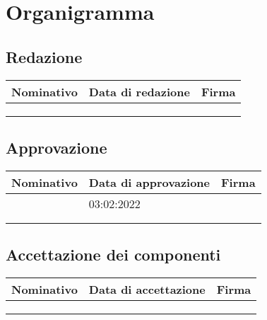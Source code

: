 \section{Organigramma}
\subsection*{Redazione}
\renewcommand{\arraystretch}{2}
\begin{table}[H]
	\begin{tabular}{|p{4cm}|p{2cm}|p{4cm}|}
		\hline
		\textbf{Nominativo}& \textbf{Data di redazione}  & \textbf{Firma}  \\ \hline
		&  &   \\ \hline
		&  &   \\ \hline
		&  &   \\ \hline
	\end{tabular}
\end{table}

\subsection*{Approvazione}
\begin{table}[H]
	\begin{tabular}{|p{4cm}|p{2cm}|p{4cm}|}
		\hline
		\textbf{Nominativo}& \textbf{Data di approvazione}  & \textbf{Firma}  \\ \hline
		&03:02:2022  &   \\ \hline
		&  &   \\ \hline
		&  &   \\ \hline
	\end{tabular}
\end{table}

\subsection*{Accettazione dei componenti}
\begin{table}[H]
	\begin{tabular}{|p{4cm}|p{2cm}|p{4cm}|}
		\hline
		\textbf{Nominativo}& \textbf{Data di accettazione}  & \textbf{Firma}  \\ \hline
		&  &   \\ \hline
		&  &   \\ \hline
		&  &   \\ \hline
	\end{tabular}
\end{table}


